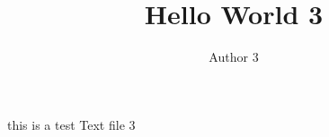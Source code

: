 \documentclass{article}
\title{Hello World 3}
\author{Author 3}
\begin{document}
\maketitle

this is a test Text file 3
\end{document}
